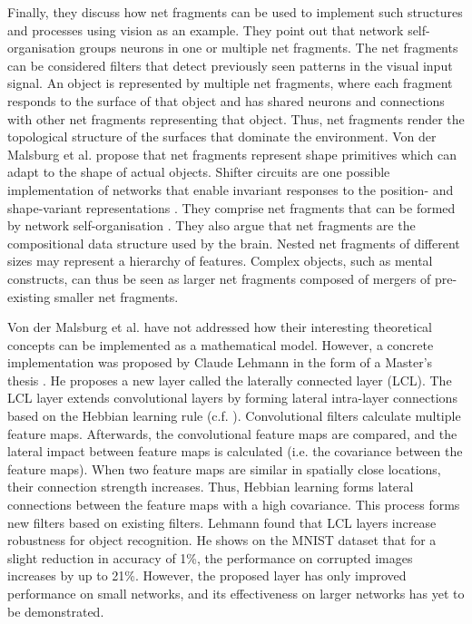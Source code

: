 Finally, they discuss how net fragments can be used to implement such structures and processes using vision as an example.
They point out that network self-organisation groups neurons in one or multiple net fragments.
The net fragments can be considered filters that detect previously seen patterns in the visual input signal.
An object is represented by multiple net fragments, where each fragment responds to the surface of that object and has shared neurons and connections with other net fragments representing that object.
Thus, net fragments render the topological structure of the surfaces that dominate the environment.
Von der Malsburg et al.  propose that net fragments represent shape primitives which can adapt to the shape of actual objects.
Shifter circuits are one possible implementation of networks that enable invariant responses to the position- and shape-variant representations .
They comprise net fragments that can be formed by network self-organisation .
They also argue that net fragments are the compositional data structure used by the brain.
Nested net fragments of different sizes may represent a hierarchy of features.
Complex objects, such as mental constructs, can thus be seen as larger net fragments composed of mergers of pre-existing smaller net fragments.

Von der Malsburg et al. \cite{von_der_Malsburg_Stadelmann_Grewe_2022} have not addressed how their interesting theoretical concepts can be implemented as a mathematical model.
However, a concrete implementation was proposed by Claude Lehmann in the form of a Master's thesis .
He proposes a new layer called the laterally connected layer (LCL).
The LCL layer extends convolutional layers by forming lateral intra-layer connections based on the Hebbian learning rule (c.f. ).
Convolutional filters calculate multiple feature maps.
Afterwards, the convolutional feature maps are compared, and the lateral impact between feature maps is calculated (i.e. the covariance between the feature maps).
When two feature maps are similar in spatially close locations, their connection strength increases.
Thus, Hebbian learning forms lateral connections between the feature maps with a high covariance.
This process forms new filters based on existing filters.
Lehmann found that LCL layers increase robustness for object recognition.
He shows on the MNIST dataset \cite{Lecun_Bottou_Bengio_Haffner_1998} that for a slight reduction in accuracy of 1\%, the performance on corrupted images increases by up to 21\%.
However, the proposed layer has only improved performance on small networks, and its effectiveness on larger networks has yet to be demonstrated.

